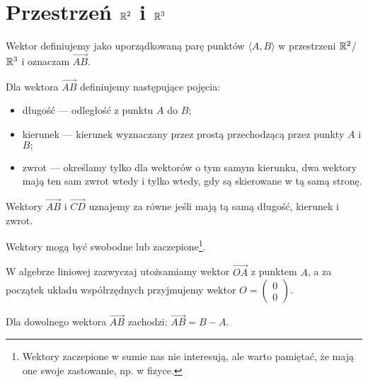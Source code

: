 \section{Przestrzeń $\mathbb{R}^2$ i $\mathbb{R}^3$} %
    
\begin{df}[geometryczna] 
    Wektor definiujemy jako uporządkowaną parę punktów $\langle A,B \rangle$ w przestrzeni $\mathbb{R}^2$/$\mathbb{R}^3$ i oznaczam $\overrightarrow{AB}.$
\end{df}
    
Dla wektora $\overrightarrow{AB}$ definiujemy następujące pojęcia:
\begin{itemize}
\item długość --- odległość z punktu $A$ do $B;$
\item kierunek --- kierunek wyznaczany przez prostą przechodzącą przez punkty $A$ i $B;$
\item zwrot --- określamy tylko dla wektorów o tym samym kierunku, dwa wektory mają ten sam zwrot wtedy i tylko wtedy, gdy są skierowane w tą samą stronę. %
\end{itemize}
    
Wektory $\overrightarrow{AB}$ i $\overrightarrow{CD}$ uznajemy za równe jeśli mają tą samą długość, kierunek i zwrot.
    
Wektory mogą być swobodne lub zaczepione\footnote{Wektory zaczepione w sumie nas nie interesują, ale warto pamiętać, że
mają one swoje zastowanie, np. w fizyce.}.
    
W algebrze liniowej zazwyczaj utożsamiamy wektor $\overrightarrow{OA}$ z punktem $A$, a za początek układu współrzędnych
przyjmujemy wektor $O=\begin{pmatrix} 0 \\ 0 \end{pmatrix}.$
    
\begin{ft} Dla dowolnego wektora $\overrightarrow{AB}$ zachodzi: $\overrightarrow{AB} = B - A.$ \end{ft}
    
\begin{center}
\end{center}
    

